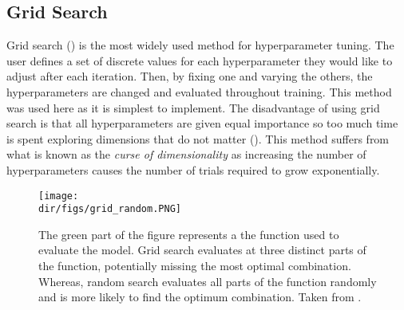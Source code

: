 \subsection{Grid Search}
Grid search (\cite{lecun10,larochelle07}) is the most widely used method for hyperparameter tuning. The user defines a set of discrete values for each hyperparameter they would like to adjust after each iteration. Then, by fixing one and varying the others, the hyperparameters are changed and evaluated throughout training. This method was used here as it is simplest to implement. The disadvantage of using grid search is that all hyperparameters are given equal importance so too much time is spent exploring dimensions that do not matter (\cite{bergstra12}). This method suffers from what is known as the \textit{curse of dimensionality} as increasing the number of hyperparameters causes the number of trials required to grow exponentially.
\begin{figure}
    \centering
    \texttt{[image: \\dir/figs/grid\_random.PNG]}
    \caption[Grid Search versus Random Search]{The green part of the figure represents a the function used to evaluate the model. Grid search evaluates at three distinct parts of the function, potentially missing the most optimal combination. Whereas, random search evaluates all parts of the function randomly and is more likely to find the optimum combination. Taken from \citet{bergstra12}.}
    \label{fig.grid_random}
\end{figure}
